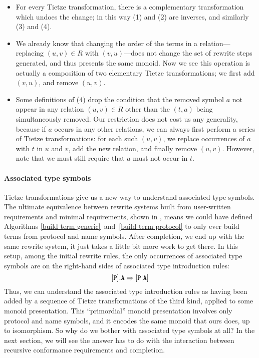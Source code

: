 \documentclass[../generics]{subfiles}
\begin{document}
\begin{itemize}
\item For every Tietze transformation, there is a complementary transformation which undoes the change; in this way (1) and (2) are inverses, and similarly (3) and (4).

\item We already know that changing the order of the terms in a relation---replacing $(u,v)\in R$ with $(v,u)$---does not change the set of rewrite steps generated, and thus presents the same monoid. Now we see this operation is actually a composition of two elementary Tietze transformations; we first add $(v,u)$, and remove $(u,v)$.

\item Some definitions of (4) drop the condition that the removed symbol $a$ not appear in any relation $(u,v)\in R$ other than the $(t,a)$ being simultaneously removed. Our restriction does not cost us any generality, because if $a$ occurs in any other relations, we can always first perform a series of Tietze transformations: for each such $(u,v)$, we replace occurrences of $a$ with $t$ in $u$ and $v$, add the new relation, and finally remove $(u,v)$. However, note that we must still require that $a$ must not occur in $t$.
\end{itemize}

\paragraph{Associated type symbols} Tietze transformations give us a new way to understand associated type symbols. The ultimate equivalence between rewrite systems built from user-written requirements and minimal requirements, shown in , means we could have defined Algorithms \ref{build term generic}~and~\ref{build term protocol} to only ever build terms from protocol and name symbols. After completion, we end up with the same rewrite system, it just takes a little bit more work to get there. In this setup, among the initial rewrite rules, the only occurrences of associated type symbols are on the right-hand sides of associated type introduction rules:
\[[\texttt{P}].\texttt{A}\Rightarrow[\texttt{P}|\texttt{A}]\]
Thus, we can understand the associated type introduction rules as having been added by a sequence of Tietze transformations of the third kind, applied to some monoid presentation. This ``primordial'' monoid presentation involves only protocol and name symbols, and it encodes the same monoid that ours does, up to isomorphism. So why do we bother with associated type symbols at all? In the next section, we will see the answer has to do with the interaction between recursive conformance requirements and completion.
\end{document}
